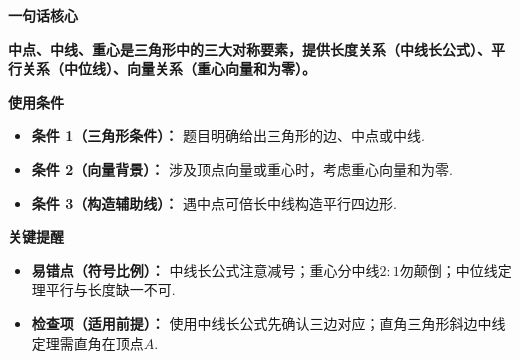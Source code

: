 \begin{summarybox}
	\textbf{\textcolor{CSummary}{一句话核心}}

	\textbf{中点、中线、重心是三角形中的三大对称要素，提供长度关系（中线长公式）、平行关系（中位线）、向量关系（重心向量和为零）。}

	\medskip
	\textbf{\textcolor{CSummary}{使用条件}}
	\begin{itemize}[leftmargin=*, itemsep=0.5em, topsep=0.4em]
		\item \textbf{条件 1（三角形条件）：} 题目明确给出三角形的边、中点或中线.
		\item \textbf{条件 2（向量背景）：} 涉及顶点向量或重心时，考虑重心向量和为零.
		\item \textbf{条件 3（构造辅助线）：} 遇中点可倍长中线构造平行四边形.
	\end{itemize}

	\medskip
	\textbf{\textcolor{CSummary}{关键提醒}}
	\begin{itemize}[leftmargin=*, itemsep=0.5em, topsep=0.4em]
		\item \textbf{易错点（符号比例）：} 中线长公式注意减号；重心分中线$2:1$勿颠倒；中位线定理平行与长度缺一不可.
		\item \textbf{检查项（适用前提）：} 使用中线长公式先确认三边对应；直角三角形斜边中线定理需直角在顶点$A$.
	\end{itemize}
\end{summarybox}
